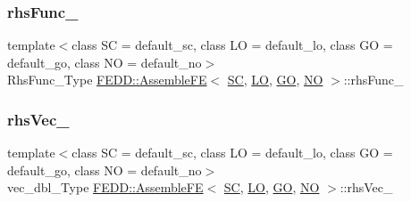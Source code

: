 \subsubsection{\texorpdfstring{rhs\+Func\+\_\+}{rhsFunc\_}}
{\footnotesize\ttfamily template$<$class SC  = default\+\_\+sc, class LO  = default\+\_\+lo, class GO  = default\+\_\+go, class NO  = default\+\_\+no$>$ \\
Rhs\+Func\+\_\+\+Type \hyperlink{classFEDD_1_1AssembleFE}{F\+E\+D\+D\+::\+Assemble\+FE}$<$ \hyperlink{fe__test__laplace_8cpp_a79c7e86a57edbb2a5a53242bcd04e41e}{SC}, \hyperlink{fe__test__laplace_8cpp_ad6a38c9f07d3fd633eefca5bccad8410}{LO}, \hyperlink{fe__test__laplace_8cpp_afa2946b509009b4f45eb04bd8c5b27d9}{GO}, \hyperlink{fe__test__laplace_8cpp_a5e24f37b28787429872b6ecb1d0417ce}{NO} $>$\+::rhs\+Func\+\_\+\hspace{0.3cm}{\ttfamily [protected]}}

\mbox{\label{classFEDD_1_1AssembleFE_a8eff2b1a9fc0125931206e83e2ab8bbd}} 
\subsubsection{\texorpdfstring{rhs\+Vec\+\_\+}{rhsVec\_}}
{\footnotesize\ttfamily template$<$class SC  = default\+\_\+sc, class LO  = default\+\_\+lo, class GO  = default\+\_\+go, class NO  = default\+\_\+no$>$ \\
vec\+\_\+dbl\+\_\+\+Type \hyperlink{classFEDD_1_1AssembleFE}{F\+E\+D\+D\+::\+Assemble\+FE}$<$ \hyperlink{fe__test__laplace_8cpp_a79c7e86a57edbb2a5a53242bcd04e41e}{SC}, \hyperlink{fe__test__laplace_8cpp_ad6a38c9f07d3fd633eefca5bccad8410}{LO}, \hyperlink{fe__test__laplace_8cpp_afa2946b509009b4f45eb04bd8c5b27d9}{GO}, \hyperlink{fe__test__laplace_8cpp_a5e24f37b28787429872b6ecb1d0417ce}{NO} $>$\+::rhs\+Vec\+\_\+\hspace{0.3cm}{\ttfamily [protected]}}

\mbox{\label{classFEDD_1_1AssembleFE_a5a0789e00592c0885abac42748c96fd7}} 
